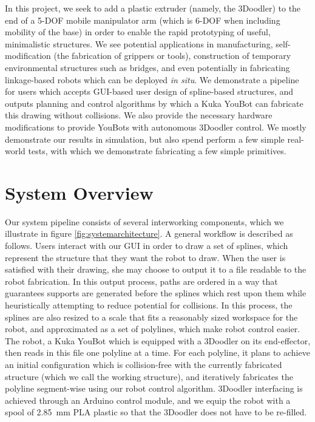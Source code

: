 \documentclass[conference]{acmsiggraph}
\begin{document}
In this project, we seek to add a plastic extruder (namely, the 3Doodler) to the end of a 5-DOF mobile manipulator arm (which is 6-DOF when including mobility of the base) in order to enable the rapid prototyping of useful, minimalistic structures.  We see potential applications in manufacturing, self-modification (the fabrication of grippers or tools), construction of temporary environmental structures such as bridges, and even potentially in fabricating linkage-based robots which can be deployed \emph{in situ}.  We demonstrate a pipeline for users which accepts GUI-based user design of spline-based structures, and outputs planning and control algorithms by which a Kuka YouBot can fabricate this drawing without collisions.  We also provide the necessary hardware modifications to provide YouBots with autonomous 3Doodler control.  We mostly demonstrate our results in simulation, but also spend perform a few simple real-world tests, with which we demonstrate fabricating a few simple primitives.

\section{System Overview}
Our system pipeline consists of several interworking components, which we illustrate in figure \ref{fig:systemarchitecture}.  A general workflow is described as follows.  Users interact with our GUI in order to draw a set of splines, which represent the structure that they want the robot to draw.  When the user is satisfied with their drawing, she may choose to output it to a file readable to the robot fabrication.  In this output process, paths are ordered in a way that guarantees supports are generated before the splines which rest upon them while heuristically attempting to reduce potential for collisions.  In this process, the splines are also resized to a scale that fits a reasonably sized workspace for the robot, and approximated as a set of polylines, which make robot control easier.  The robot, a Kuka YouBot \cite{YouBot} which is equipped with a 3Doodler on its end-effector, then reads in this file one polyline at a time.  For each polyline, it plans to achieve an initial configuration which is collision-free with the currently fabricated structure (which we call the working structure), and iteratively fabricates the polyline segment-wise using our robot control algorithm.  3Doodler interfacing is achieved through an Arduino control module, and we equip the robot with a spool of 2.85~mm PLA plastic so that the 3Doodler does not have to be re-filled.
\end{document}
